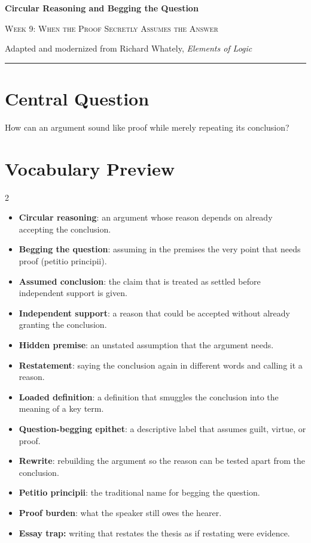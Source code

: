 \documentclass[12pt]{article}
\begin{document}
\begin{center}
{\LARGE\bfseries Circular Reasoning and Begging the Question}\par\vspace{0.25em}
{\large\scshape Week 9: When the Proof Secretly Assumes the Answer}\par\vspace{0.5em}
{Adapted and modernized from Richard Whately, \textit{Elements of Logic}}\par\vspace{0.6em}
\rule{0.82\textwidth}{0.4pt}
\end{center}

\section*{Central Question}
How can an argument sound like proof while merely repeating its conclusion?

\section*{Vocabulary Preview}
\begin{multicols}{2}
\begin{itemize}[leftmargin=*, itemsep=0.18em]
\item \textbf{Circular reasoning}: an argument whose reason depends on already accepting the conclusion.
\item \textbf{Begging the question}: assuming in the premises the very point that needs proof (petitio principii).
\item \textbf{Assumed conclusion}: the claim that is treated as settled before independent support is given.
\item \textbf{Independent support}: a reason that could be accepted without already granting the conclusion.
\item \textbf{Hidden premise}: an unstated assumption that the argument needs.
\item \textbf{Restatement}: saying the conclusion again in different words and calling it a reason.
\item \textbf{Loaded definition}: a definition that smuggles the conclusion into the meaning of a key term.
\item \textbf{Question-begging epithet}: a descriptive label that assumes guilt, virtue, or proof.
\item \textbf{Rewrite}: rebuilding the argument so the reason can be tested apart from the conclusion.
\item \textbf{Petitio principii}: the traditional name for begging the question.
\item \textbf{Proof burden}: what the speaker still owes the hearer.
\item \textbf{Essay trap:} writing that restates the thesis as if restating were evidence.
\end{itemize}
\end{multicols}
\end{document}
